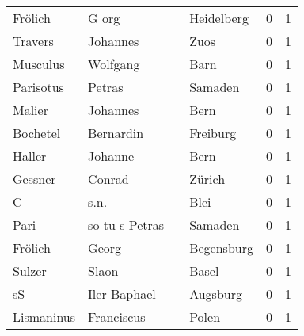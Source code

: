 \begin{center}
\begin{tiny}
\begin{longtabu}{llllrr}
                  Frölich &                              G org &             &                                  Heidelberg &          0 &         1 \\
                  Travers &                           Johannes &             &                                        Zuos &          0 &         1 \\
                 Musculus &                           Wolfgang &             &                                        Barn &          0 &         1 \\
                Parisotus &                             Petras &             &                                     Samaden &          0 &         1 \\
                   Malier &                           Johannes &             &                                        Bern &          0 &         1 \\
                 Bochetel &                          Bernardin &             &                                    Freiburg &          0 &         1 \\
                   Haller &                            Johanne &             &                                        Bern &          0 &         1 \\
                  Gessner &                             Conrad &             &                                      Zürich &          0 &         1 \\
                        C &                               s.n. &             &                                        Blei &          0 &         1 \\
                     Pari &                     so tu s Petras &             &                                     Samaden &          0 &         1 \\
                  Frölich &                              Georg &             &                                  Begensburg &          0 &         1 \\
                   Sulzer &                              Slaon &             &                                       Basel &          0 &         1 \\
                       sS &                       Iler Baphael &             &                                    Augsburg &          0 &         1 \\
               Lismaninus &                         Franciscus &             &                                       Polen &          0 &         1 \\

\end{longtabu}
\end{tiny}
\end{center}
